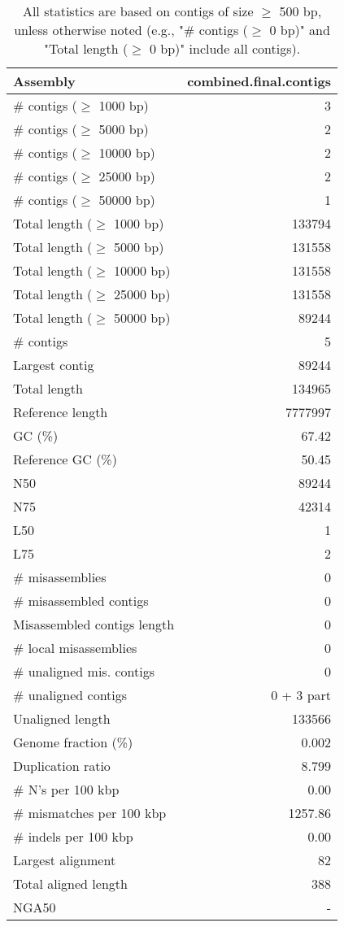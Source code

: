 \documentclass[12pt,a4paper]{article}
\begin{document}
\begin{table}[ht]
\begin{center}
\caption{All statistics are based on contigs of size $\geq$ 500 bp, unless otherwise noted (e.g., "\# contigs ($\geq$ 0 bp)" and "Total length ($\geq$ 0 bp)" include all contigs).}
\begin{tabular}{|l*{1}{|r}|}
\hline
Assembly & combined.final.contigs \\ \hline
\# contigs ($\geq$ 1000 bp) & 3 \\ \hline
\# contigs ($\geq$ 5000 bp) & 2 \\ \hline
\# contigs ($\geq$ 10000 bp) & 2 \\ \hline
\# contigs ($\geq$ 25000 bp) & 2 \\ \hline
\# contigs ($\geq$ 50000 bp) & 1 \\ \hline
Total length ($\geq$ 1000 bp) & 133794 \\ \hline
Total length ($\geq$ 5000 bp) & 131558 \\ \hline
Total length ($\geq$ 10000 bp) & 131558 \\ \hline
Total length ($\geq$ 25000 bp) & 131558 \\ \hline
Total length ($\geq$ 50000 bp) & 89244 \\ \hline
\# contigs & 5 \\ \hline
Largest contig & 89244 \\ \hline
Total length & 134965 \\ \hline
Reference length & 7777997 \\ \hline
GC (\%) & 67.42 \\ \hline
Reference GC (\%) & 50.45 \\ \hline
N50 & 89244 \\ \hline
N75 & 42314 \\ \hline
L50 & 1 \\ \hline
L75 & 2 \\ \hline
\# misassemblies & 0 \\ \hline
\# misassembled contigs & 0 \\ \hline
Misassembled contigs length & 0 \\ \hline
\# local misassemblies & 0 \\ \hline
\# unaligned mis. contigs & 0 \\ \hline
\# unaligned contigs & 0 + 3 part \\ \hline
Unaligned length & 133566 \\ \hline
Genome fraction (\%) & 0.002 \\ \hline
Duplication ratio & 8.799 \\ \hline
\# N's per 100 kbp & 0.00 \\ \hline
\# mismatches per 100 kbp & 1257.86 \\ \hline
\# indels per 100 kbp & 0.00 \\ \hline
Largest alignment & 82 \\ \hline
Total aligned length & 388 \\ \hline
NGA50 & - \\ \hline
\end{tabular}
\end{center}
\end{table}
\end{document}
